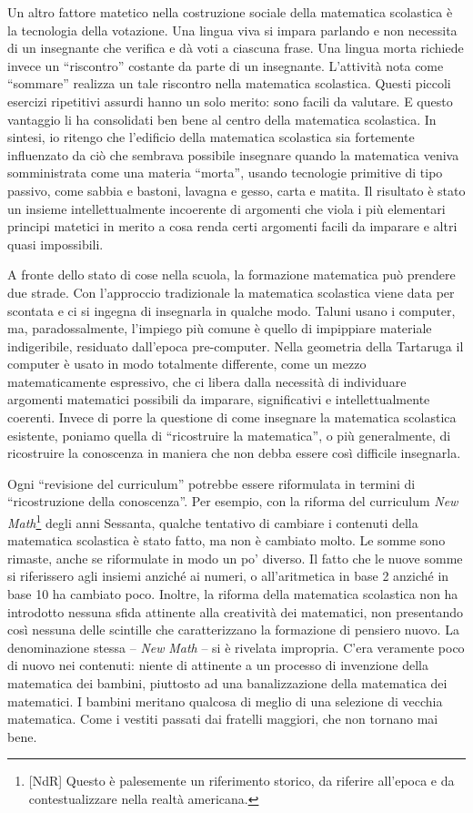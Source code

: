 Un altro fattore matetico nella costruzione sociale della matematica scolastica è la tecnologia della votazione. Una lingua viva si impara parlando e non necessita di un insegnante che verifica e dà voti a ciascuna frase. Una lingua morta richiede invece un “riscontro” costante da parte di un insegnante. L'attività nota come “sommare” realizza un tale riscontro nella matematica scolastica. Questi piccoli esercizi ripetitivi assurdi hanno un solo merito: sono facili da valutare. E questo vantaggio li ha consolidati ben bene al centro della matematica scolastica. In sintesi, io ritengo che l'edificio della matematica scolastica sia fortemente influenzato da ciò che sembrava possibile insegnare quando la matematica veniva somministrata come una materia “morta”, usando tecnologie primitive di  tipo passivo, come sabbia e bastoni, lavagna e gesso, carta e matita. Il risultato è stato un insieme intellettualmente incoerente di argomenti che viola i più elementari  principi matetici in merito a cosa renda certi argomenti facili da imparare e altri quasi impossibili.

A fronte dello stato di cose nella scuola, la formazione matematica può prendere due strade. Con l'approccio tradizionale la matematica scolastica viene data per scontata e ci si ingegna di insegnarla in qualche modo. Taluni usano i computer, ma, paradossalmente, l'impiego più comune è quello di impippiare materiale indigeribile, residuato dall'epoca pre-computer. Nella geometria della Tartaruga  il computer è usato in modo totalmente differente, come un mezzo matematicamente espressivo, che ci libera dalla necessità di individuare argomenti matematici possibili da imparare, significativi e intellettualmente coerenti. Invece di porre la questione di come insegnare la matematica scolastica esistente, poniamo quella di “ricostruire la matematica”, o più generalmente, di ricostruire la conoscenza in maniera che non debba essere così difficile insegnarla.

Ogni “revisione del curriculum” potrebbe essere riformulata in termini di “ricostruzione della conoscenza”. Per esempio, con la riforma del curriculum \textit{New Math}\footnote{[NdR] Questo è palesemente un riferimento storico, da riferire all'epoca e da contestualizzare nella realtà americana.} degli anni Sessanta, qualche tentativo di cambiare i contenuti della matematica scolastica è stato fatto, ma non è cambiato molto. Le somme sono rimaste, anche se riformulate in modo un po' diverso. Il fatto che  le nuove somme si riferissero agli insiemi anziché ai numeri, o all'aritmetica in base 2 anziché in base 10 ha cambiato poco. Inoltre, la riforma della matematica scolastica non ha introdotto nessuna sfida attinente alla creatività dei matematici, non presentando così nessuna delle scintille che caratterizzano la formazione di pensiero nuovo. La denominazione stessa – \textit{New} \textit{Math} – si è rivelata impropria. C'era veramente poco di nuovo nei contenuti: niente di attinente a un processo di invenzione della matematica dei bambini, piuttosto ad una banalizzazione della matematica dei matematici. I bambini meritano qualcosa di meglio di una selezione di vecchia matematica. Come i vestiti passati dai fratelli maggiori, che non tornano mai bene.

